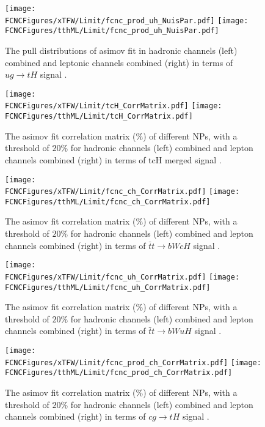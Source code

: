 \begin{figure}[H]
\centering
\texttt{[image: \\FCNCFigures/xTFW/Limit/fcnc\_prod\_uh\_NuisPar.pdf]}
\texttt{[image: \\FCNCFigures/tthML/Limit/fcnc\_prod\_uh\_NuisPar.pdf]}
\caption{ The pull distributions of asimov fit in hadronic channels (left) combined and leptonic channels combined (right) in terms of $ug\to tH$ signal . }
\label{fig:fcnc_prod_uh_NuisPar}
\end{figure}

\begin{figure}[H]
\centering
\texttt{[image: \\FCNCFigures/xTFW/Limit/tcH\_CorrMatrix.pdf]}
\texttt{[image: \\FCNCFigures/tthML/Limit/tcH\_CorrMatrix.pdf]}
\caption{ The asimov fit correlation matrix ($\%$) of different NPs, with a threshold of $20\%$ for hadronic channels (left) combined and lepton channels combined (right) in terms of tcH merged signal . }
\label{fig:tcH_CorrMatrix}
\end{figure}

\begin{figure}[H]
\centering
\texttt{[image: \\FCNCFigures/xTFW/Limit/fcnc\_ch\_CorrMatrix.pdf]}
\texttt{[image: \\FCNCFigures/tthML/Limit/fcnc\_ch\_CorrMatrix.pdf]}
\caption{ The asimov fit correlation matrix ($\%$) of different NPs, with a threshold of $20\%$ for hadronic channels (left) combined and lepton channels combined (right) in terms of $\bar{t}t\to bWcH$ signal . }
\label{fig:fcnc_ch_CorrMatrix}
\end{figure}

\begin{figure}[H]
\centering
\texttt{[image: \\FCNCFigures/xTFW/Limit/fcnc\_uh\_CorrMatrix.pdf]}
\texttt{[image: \\FCNCFigures/tthML/Limit/fcnc\_uh\_CorrMatrix.pdf]}
\caption{ The asimov fit correlation matrix ($\%$) of different NPs, with a threshold of $20\%$ for hadronic channels (left) combined and lepton channels combined (right) in terms of $\bar{t}t\to bWuH$ signal . }
\label{fig:fcnc_uh_CorrMatrix}
\end{figure}

\begin{figure}[H]
\centering
\texttt{[image: \\FCNCFigures/xTFW/Limit/fcnc\_prod\_ch\_CorrMatrix.pdf]}
\texttt{[image: \\FCNCFigures/tthML/Limit/fcnc\_prod\_ch\_CorrMatrix.pdf]}
\caption{ The asimov fit correlation matrix ($\%$) of different NPs, with a threshold of $20\%$ for hadronic channels (left) combined and lepton channels combined (right) in terms of $cg\to tH$ signal . }
\label{fig:fcnc_prod_ch_CorrMatrix}
\end{figure}


